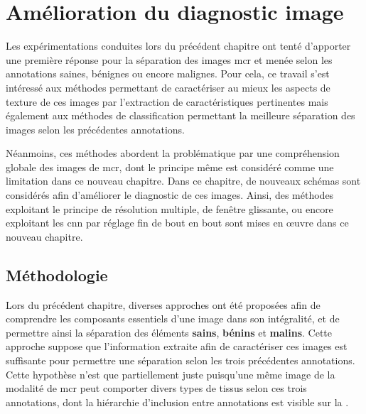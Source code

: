 \renewcommand{\thechapter}{\arabic{chapter}}
\setcounter{chapter}{5}

\chapter{Amélioration du diagnostic image}
\label{chap:chapter_6}
\chapterintro
Les expérimentations conduites lors du précédent chapitre ont tenté d'apporter une première réponse pour la séparation des images \acrlong{mcr} et menée selon les annotations saines, bénignes ou encore malignes. Pour cela, ce travail s'est intéressé aux méthodes permettant de caractériser au mieux les aspects de texture de ces images par l'extraction de caractéristiques pertinentes mais également aux méthodes de classification permettant la meilleure séparation des images selon les précédentes annotations.\par

Néanmoins, ces méthodes abordent la problématique par une compréhension globale des images de \acrlong{mcr}, dont le principe même est considéré comme une limitation dans ce nouveau chapitre. Dans ce chapitre, de nouveaux schémas sont considérés afin d'améliorer le diagnostic de ces images. Ainsi, des méthodes exploitant le principe de résolution multiple, de fenêtre glissante, ou encore exploitant les \acrlong{cnn} par réglage fin de bout en bout sont mises en œuvre dans ce nouveau chapitre.\par

\newpage

\section{Méthodologie}
Lors du précédent chapitre, diverses approches ont été proposées afin de comprendre les composants essentiels d'une image dans son intégralité, et de permettre ainsi la séparation des éléments \textbf{sains}, \textbf{bénins} et \textbf{malins}. Cette approche suppose que l'information extraite afin de caractériser ces images est suffisante pour permettre une séparation selon les trois précédentes annotations. Cette hypothèse n'est que partiellement juste puisqu'une même image de la modalité de \gls{mcr} peut comporter divers types de tissus selon ces trois annotations, dont la hiérarchie d'inclusion entre annotations est visible sur la .\par

